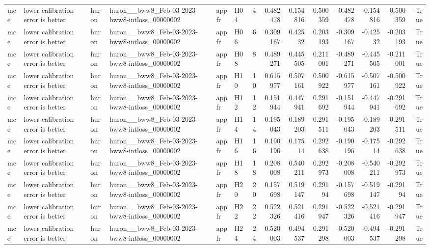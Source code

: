 \begin{longtable}{llllllrrrrrrrr}
mce & lower calibration error is better & huron & huron\_\_bww8\_Feb-03-2023-bww8-intloss\_00000002 & appfr & H04 & 4 & 0.482478 & 0.154816 & 0.500359 & -0.482478 & -0.154816 & -0.500359 & True \\
mce & lower calibration error is better & huron & huron\_\_bww8\_Feb-03-2023-bww8-intloss\_00000002 & appfr & H06 & 6 & 0.309167 & 0.42532 & 0.203193 & -0.309167 & -0.42532 & -0.203193 & True \\
mce & lower calibration error is better & huron & huron\_\_bww8\_Feb-03-2023-bww8-intloss\_00000002 & appfr & H08 & 8 & 0.489271 & 0.445505 & 0.211001 & -0.489271 & -0.445505 & -0.211001 & True \\
mce & lower calibration error is better & huron & huron\_\_bww8\_Feb-03-2023-bww8-intloss\_00000002 & appfr & H10 & 10 & 0.615977 & 0.507161 & 0.500922 & -0.615977 & -0.507161 & -0.500922 & True \\
mce & lower calibration error is better & huron & huron\_\_bww8\_Feb-03-2023-bww8-intloss\_00000002 & appfr & H12 & 12 & 0.151944 & 0.447941 & 0.291692 & -0.151944 & -0.447941 & -0.291692 & True \\
mce & lower calibration error is better & huron & huron\_\_bww8\_Feb-03-2023-bww8-intloss\_00000002 & appfr & H14 & 14 & 0.195043 & 0.189203 & 0.291511 & -0.195043 & -0.189203 & -0.291511 & True \\
mce & lower calibration error is better & huron & huron\_\_bww8\_Feb-03-2023-bww8-intloss\_00000002 & appfr & H16 & 16 & 0.190196 & 0.17514 & 0.292638 & -0.190196 & -0.17514 & -0.292638 & True \\
mce & lower calibration error is better & huron & huron\_\_bww8\_Feb-03-2023-bww8-intloss\_00000002 & appfr & H18 & 18 & 0.208008 & 0.540211 & 0.292973 & -0.208008 & -0.540211 & -0.292973 & True \\
mce & lower calibration error is better & huron & huron\_\_bww8\_Feb-03-2023-bww8-intloss\_00000002 & appfr & H20 & 20 & 0.157698 & 0.519147 & 0.29194 & -0.157698 & -0.519147 & -0.29194 & True \\
mce & lower calibration error is better & huron & huron\_\_bww8\_Feb-03-2023-bww8-intloss\_00000002 & appfr & H22 & 22 & 0.522326 & 0.521416 & 0.291947 & -0.522326 & -0.521416 & -0.291947 & True \\
mce & lower calibration error is better & huron & huron\_\_bww8\_Feb-03-2023-bww8-intloss\_00000002 & appfr & H24 & 24 & 0.520003 & 0.494537 & 0.291298 & -0.520003 & -0.494537 & -0.291298 & True \\

\end{longtable}
